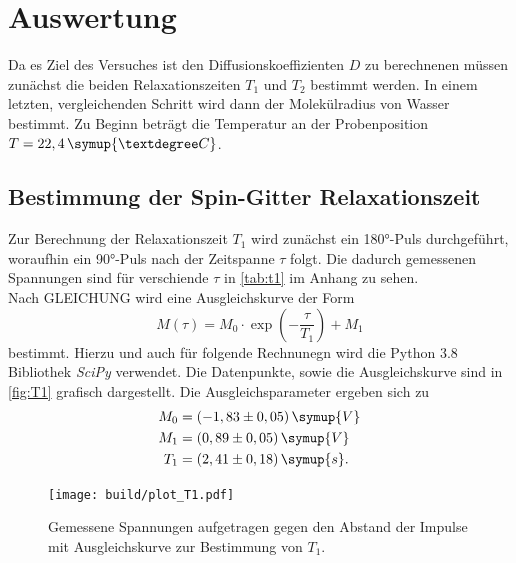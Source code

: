 \section{Auswertung}
Da es Ziel des Versuches ist den Diffusionskoeffizienten $D$ zu berechnenen müssen zunächst die beiden 
Relaxationszeiten $T_1$ und $T_2$ bestimmt werden. In einem letzten, vergleichenden Schritt wird dann 
der Molekülradius von Wasser bestimmt.
Zu Beginn beträgt die Temperatur an der Probenposition $T = 22,4\,\symup{°C}$. 
\subsection{Bestimmung der Spin-Gitter Relaxationszeit} 
Zur Berechnung der Relaxationszeit $T_1$ wird zunächst ein 180°-Puls durchgeführt, woraufhin ein 90°-Puls 
nach der Zeitspanne $\tau$ folgt. Die dadurch gemessenen Spannungen sind für verschiende $\tau$ in \autoref{tab:t1} im Anhang
zu sehen. \\
Nach GLEICHUNG wird eine Ausgleichskurve der Form 
\begin{equation*}
    M(\tau) = M_0 \cdot \exp \left( -\frac{\tau}{T_1} \right) + M_1
\end{equation*}
bestimmt. Hierzu und auch für folgende Rechnunegn wird die Python 3.8 Bibliothek \textit{SciPy}\cite{scipy}
verwendet. Die Datenpunkte, sowie die Ausgleichskurve sind in \autoref{fig:T1} grafisch dargestellt.
Die Ausgleichsparameter ergeben sich zu 
\begin{align*}
    M_0 &= (-1,83 \pm 0,05) \, \symup{V} \\
    M_1 &= (0,89 \pm 0,05) \, \symup{V} \\
    T_1 &= (2,41 \pm 0,18) \, \symup{s}.
\end{align*}
\begin{figure}
    \centering
    \texttt{[image: build/plot\_T1.pdf]}
    \caption{Gemessene Spannungen aufgetragen gegen den Abstand der Impulse mit Ausgleichskurve zur Bestimmung von $T_1$.}
    \label{fig:T1}
\end{figure}

